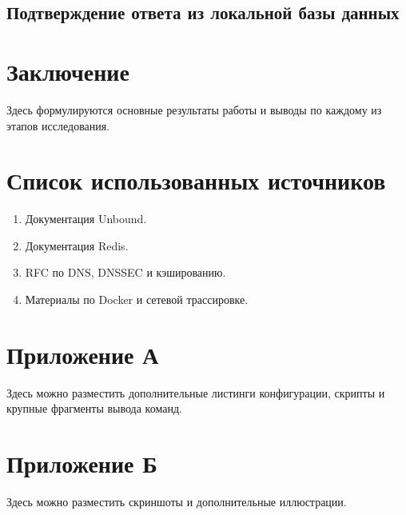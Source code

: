 \documentclass[a4paper,14pt]{extarticle}
\begin{document}
\subsection{Подтверждение ответа из локальной базы данных}

\section{Заключение}

Здесь формулируются основные результаты работы и выводы по каждому из этапов исследования.

\section{Список использованных источников}

\begin{enumerate}
    \item Документация Unbound.
    \item Документация Redis.
    \item RFC по DNS, DNSSEC и кэшированию.
    \item Материалы по Docker и сетевой трассировке.
\end{enumerate}

\section*{Приложение А}

Здесь можно разместить дополнительные листинги конфигурации, скрипты и крупные фрагменты вывода команд.

\section*{Приложение Б}

Здесь можно разместить скриншоты и дополнительные иллюстрации.
\end{document}
